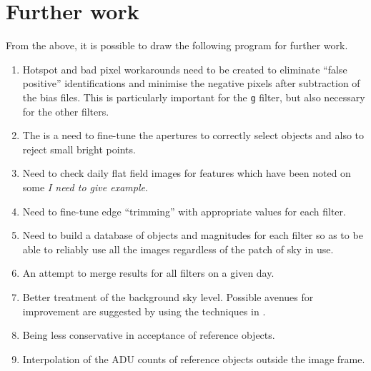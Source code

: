 \section{Further work}
\protect\label{section:worktocome}

From the above, it is possible to draw the following program for further work.

\begin{enumerate}
  \item Hotspot and bad pixel workarounds need to be created to eliminate
  ``false positive'' identifications and minimise the negative pixels after
  subtraction of the bias files. This is particularly important for the
  \texttt{g} filter, but also necessary for the other filters.
  \item The is a need to fine-tune the apertures to correctly select objects
  and also to reject small bright points.
  \item Need to check daily flat field images for features which have been noted
  on some \textit{I need to give example}.
  \item Need to fine-tune edge ``trimming'' with appropriate values for each
  filter.
  \item Need to build a database of objects and magnitudes for each filter so as
  to be able to reliably use all the images regardless of the patch of sky in
  use.
  \item An attempt to merge results for all filters on a given day.
  \item Better treatment of the background sky level. Possible avenues for improvement are suggested by using the
      techniques in \citet{dubovsky17}.
  \item Being less conservative in acceptance of reference objects.
  \item Interpolation of the ADU counts of reference objects outside the image
  frame.
\end{enumerate}


